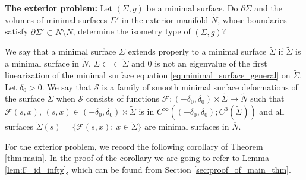 \documentclass[12pt]{amsart}
\def\p{\partial}
\theoremstyle{definition}
\theoremstyle{remark}
\begin{document}
\noindent\textbf{The exterior problem:} Let $(\Sigma,g)$ be a minimal surface. Do $\p \Sigma$ and the volumes of minimal surfaces $\Sigma'$ in the exterior manifold $\widetilde N$, whose boundaries satisfy
$\partial \Sigma'\subset \widetilde N\setminus N$, determine the isometry type of $(\Sigma,g)$?


We say that a minimal surface $\Sigma$ extends properly to a minimal surface $\widetilde \Sigma$ if $\widetilde \Sigma$ is a minimal surface in $\widetilde N$, $\Sigma\subset \subset \widetilde \Sigma$ and $0$ is not an eigenvalue of the first linearization of the minimal surface equation \eqref{eq:minimal_surface_general} on $\widetilde \Sigma$. %
Let  $\delta_0>0$.
We say that $\mathcal S$   is  a family of smooth  minimal surface  deformations of the surface $\widetilde \Sigma$ when $\mathcal S$  consists of functions  $\mathcal F:(-\delta_0,\delta_0)\times  \widetilde \Sigma\to \widetilde N$ such that $\mathcal F(s,x)$, $(s,x)\in (-\delta_0,\delta_0)\times \widetilde \Sigma$
is in $C^\infty((-\delta_0,\delta_0);C^3( \widetilde \Sigma))$ and all surfaces $\widetilde \Sigma(s)=\{\mathcal F(s,x):\ x\in \widetilde \Sigma\}$ are minimal surfaces in $\overline N$.


For the exterior problem, we record the following corollary of Theorem \ref{thm:main}. %
In the proof of the corollary we are going to refer to Lemma \ref{lem:F_id_infty}, which can be found from Section \ref{sec:proof_of_main_thm}. 
\end{document}
